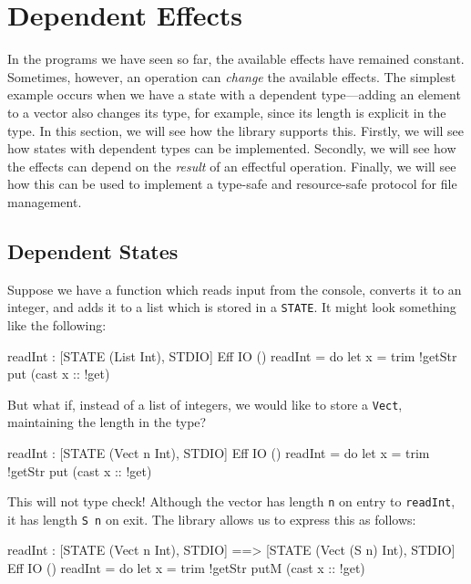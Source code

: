 \section{Dependent Effects}

In the programs we have seen so far, the available effects have remained
constant. Sometimes, however, an operation can \emph{change} the available
effects. The simplest example occurs when we have a state with a dependent
type---adding an element to a vector also changes its type, for example,
since its length is explicit in the type. In this section, we will see how
the \effects{} library supports this. Firstly, we will see how states with
dependent types can be implemented. Secondly, we will see how the effects
can depend on the \emph{result} of an effectful operation. Finally, we will
see how this can be used to implement a type-safe and resource-safe protocol
for file management.

\subsection{Dependent States}

Suppose we have a function which reads input from the console, converts it
to an integer, and adds it to a list which is stored in a \texttt{STATE}.
It might look something like the following:

\begin{code}
readInt : { [STATE (List Int), STDIO] } Eff IO ()
readInt = do let x = trim !getStr
             put (cast x :: !get)
\end{code}

\noindent
But what if, instead of a list of integers, we would like to store a
\texttt{Vect}, maintaining the length in the type?

\begin{code}
readInt : { [STATE (Vect n Int), STDIO] } Eff IO ()
readInt = do let x = trim !getStr
             put (cast x :: !get)
\end{code}

\noindent
This will not type check! Although the vector has length \texttt{n} on
entry to \texttt{readInt}, it has length \texttt{S n} on exit. The
\effects{} library allows us to express this as follows:

\begin{code}
readInt : { [STATE (Vect n Int), STDIO] ==>
            [STATE (Vect (S n) Int), STDIO] } Eff IO ()
readInt = do let x = trim !getStr
             putM (cast x :: !get)
\end{code}

